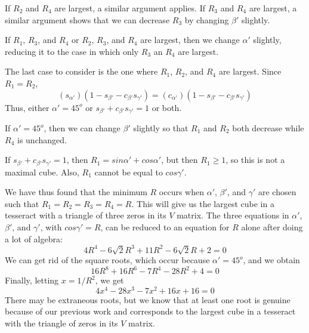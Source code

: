 If $R_2$ and $R_4$ are largest, a similar argument applies.  If $R_3$ and
$R_4$ are largest, a similar argument shows that we can decrease $R_3$ by
changing $\beta'$ slightly.

If $R_1$, $R_3$, and $R_4$ or $R_2$, $R_3$, and $R_4$ are largest, then we
change $\alpha'$ slightly, reducing it to the case in which only $R_3$ an
$R_4$ are largest.

The last case to consider is the one where $R_1$, $R_2$, and $R_4$ are
largest.  Since $R_1 = R_2$,
\begin{equation*}
(s_{\alpha'})(1 - s_{\beta'} - c_{\beta'} s_{\gamma'}) =
(c_{\alpha'})(1 - s_{\beta'} - c_{\beta'} s_{\gamma'})
\end{equation*}
Thus, either $\alpha' = 45^o$ or $s_{\beta'} + c_{\beta'} s_{\gamma'} = 1$ or
both.

If $\alpha' = 45^o$, then we can change $\beta'$ slightly so that $R_1$ and
$R_2$ both decrease while $R_4$ is unchanged.

If $s_{\beta'} + c_{\beta'} s_{\gamma'} = 1$, then $R_1 = sin\alpha' +
cos\alpha'$, but then $R_1 \geq 1$, so this is not a maximal cube.  Also,
$R_1$ cannot be equal to $cos\gamma'$.

We have thus found that the minimum $R$ occurs when $\alpha'$, $\beta'$, and
$\gamma'$ are chosen such that $R_1 = R_2 = R_3 = R_4 = R$.  This will give us
the largest cube in a tesseract with a triangle of three zeros in its $V$
matrix.  The three equations in $\alpha'$, $\beta'$, and $\gamma'$, with
$cos\gamma' = R$, can be reduced to an equation for $R$ alone after doing a
lot of algebra:
\begin{equation*}
4 R^4 - 6 \sqrt{2} R^3 + 11 R^2 - 6 \sqrt{2} R + 2 = 0
\end{equation*}
We can get rid of the square roots, which occur because $\alpha' = 45^o$, and
we obtain
\begin{equation*}
16 R^8 + 16 R^6 - 7 R^4 - 28 R^2 + 4 = 0
\end{equation*}
Finally, letting $x = 1/R^2$, we get
\begin{equation*}
4 x^4 - 28 x^3 - 7 x^2 + 16 x + 16 = 0
\end{equation*}
There may be extraneous roots, but we know that at least one root is genuine
because of our previous work and corresponds to the largest cube in a tesseract
with the triangle of zeros in its $V$ matrix.

